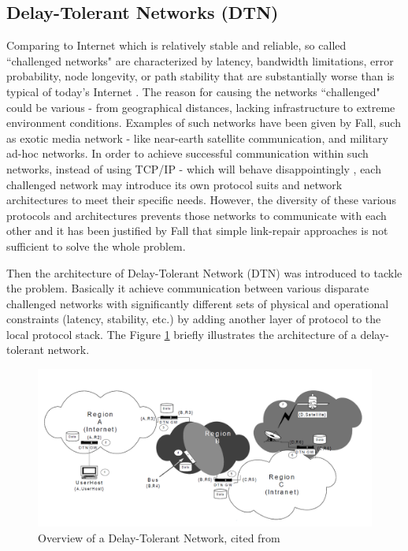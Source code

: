 \subsection{Delay-Tolerant Networks (DTN)}
Comparing to Internet which is relatively stable and reliable, so called ``challenged networks" are characterized by latency, bandwidth limitations, error probability, node longevity, or path stability that are substantially worse than is typical of today’s Internet \cite{Kevin}. The reason for causing the networks ``challenged" could be various - from geographical distances, lacking infrastructure to extreme environment conditions. Examples of such networks have been given by Fall, such as exotic media network - like near-earth satellite communication, and military ad-hoc networks. In order to achieve successful communication within such networks, instead of using TCP/IP - which will behave disappointingly \cite{Scott}, each challenged network may introduce its own protocol suits and network architectures to meet their specific needs. However, the diversity of these various protocols and architectures prevents those networks to communicate with each other and it has been justified by Fall \cite{Kevin} that simple link-repair approaches is not sufficient to solve the whole problem.

Then the architecture of Delay-Tolerant Network (DTN) was introduced to tackle the problem. Basically it achieve communication between various disparate challenged networks with significantly different sets of physical and operational constraints (latency, stability, etc.) by adding another layer of protocol to the local protocol stack. The Figure \ref{fig:dtn} briefly illustrates the architecture of a delay-tolerant network.

\begin{figure}[h!]
\centering
\includegraphics[width=\textwidth,natwidth=1420,natheight=672]{figures/dtn.png}
\caption{Overview of a Delay-Tolerant Network, cited from \cite{Kevin}}
\label{fig:dtn}
\end{figure}

